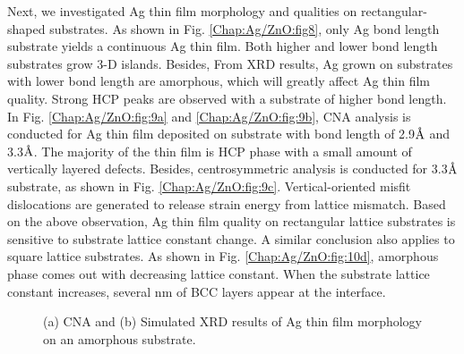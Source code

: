 Next, we investigated Ag thin film morphology and qualities on rectangular-shaped substrates. As shown in Fig. \ref{Chap:Ag/ZnO:fig8}, only Ag bond length substrate yields a continuous Ag thin film. Both higher and lower bond length substrates grow 3-D islands. Besides, From \ac{XRD} results, Ag grown on substrates with lower bond length are amorphous, which will greatly affect Ag thin film quality. Strong \ac{HCP} peaks are observed with a substrate of higher bond length. In Fig. \ref{Chap:Ag/ZnO:fig:9a} and \ref{Chap:Ag/ZnO:fig:9b}, \ac{CNA} analysis is conducted for Ag thin film deposited on substrate with bond length of 2.9$\mbox{\normalfont\AA}$ and 3.3$\mbox{\normalfont\AA}$. The majority of the thin film is \ac{HCP} phase with a small amount of vertically layered defects. Besides, centrosymmetric analysis is conducted for 3.3$\mbox{\normalfont\AA}$ substrate, as shown in Fig. \ref{Chap:Ag/ZnO:fig:9c}. Vertical-oriented misfit dislocations are generated to release strain energy from lattice mismatch. Based on the above observation, Ag thin film quality on rectangular lattice substrates is sensitive to substrate lattice constant change. A similar conclusion also applies to square lattice substrates. As shown in Fig. \ref{Chap:Ag/ZnO:fig:10d}, amorphous phase comes out with decreasing lattice constant. When the substrate lattice constant increases, several nm of \ac{BCC} layers appear at the interface. 

\newpage
\begingroup
\begin{figure}[!ht]
  \centering
  \label{Chap:Ag/ZnO:fig:11a}
  \label{Chap:Ag/ZnO:fig:11b}
\caption[CNA and Simulated XRD results of Ag thin film morphology on an amorphous substrate.]{(a) \ac{CNA} and (b) Simulated \ac{XRD} results of Ag thin film morphology on an amorphous substrate.}
\label{Chap:Ag/ZnO:fig11}
\end{figure}
\endgroup

